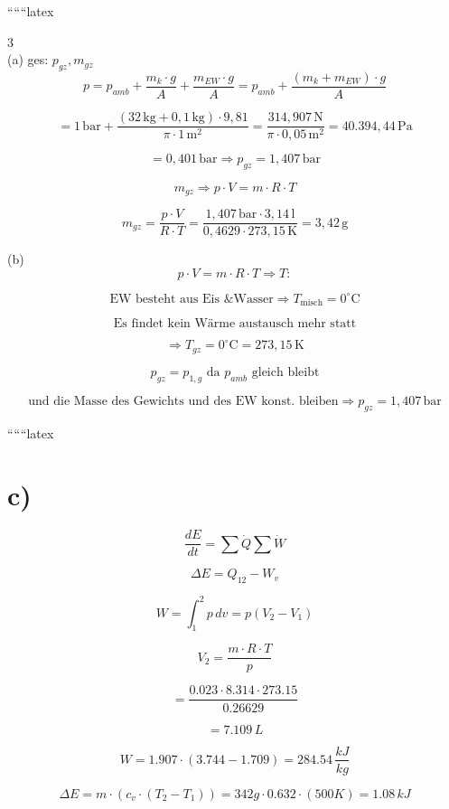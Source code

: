 
``````latex


3 \\
(a) ges: $p_{gz}, m_{gz}$ \\

\[
p = p_{amb} + \frac{m_k \cdot g}{A} + \frac{m_{EW} \cdot g}{A} = p_{amb} + \frac{(m_k + m_{EW}) \cdot g}{A}
\]

\[
= 1 \, \text{bar} + \frac{(32 \, \text{kg} + 0,1 \, \text{kg}) \cdot 9,81}{\pi \cdot 1 \, \text{m}^2} = \frac{314,907 \, \text{N}}{\pi \cdot 0,05 \, \text{m}^2} = 40.394,44 \, \text{Pa}
\]

\[
= 0,401 \, \text{bar} \Rightarrow p_{gz} = 1,407 \, \text{bar}
\]

\[
m_{gz} \Rightarrow p \cdot V = m \cdot R \cdot T
\]

\[
m_{gz} = \frac{p \cdot V}{R \cdot T} = \frac{1,407 \, \text{bar} \cdot 3,14 \, \text{l}}{0,4629 \cdot 273,15 \, \text{K}} = 3,42 \, \text{g}
\]

(b) \\
\[
p \cdot V = m \cdot R \cdot T \Rightarrow T:
\]

\[
\text{EW besteht aus Eis \& Wasser} \Rightarrow T_{\text{misch}} = 0^\circ \text{C}
\]

\[
\text{Es findet kein Wärme austausch mehr statt}
\]

\[
\Rightarrow T_{gz} = 0^\circ \text{C} = 273,15 \, \text{K}
\]

\[
p_{gz} = p_{1, g} \text{ da } p_{amb} \text{ gleich bleibt}
\]

\[
\text{und die Masse des Gewichts und des EW konst. bleiben} \Rightarrow p_{gz} = 1,407 \, \text{bar}
\]

``````latex


\section*{c)}

\[
\frac{dE}{dt} = \sum \dot{Q} \sum \dot{W}
\]

\[
\Delta E = Q_{12} - W_v
\]

\[
W = \int_{1}^{2} p \, dv = p (V_2 - V_1)
\]

\[
V_2 = \frac{m \cdot R \cdot T}{p}
\]

\[
= \frac{0.023 \cdot 8.314 \cdot 273.15}{0.26629}
\]

\[
= 7.109 \, L
\]

\[
W = 1.907 \cdot (3.744 - 1.709) = 284.54 \, \frac{kJ}{kg}
\]

\[
\Delta E = m \cdot (c_v \cdot (T_2 - T_1)) = 342g \cdot 0.632 \cdot (500K) = 1.08 \, kJ
\]

